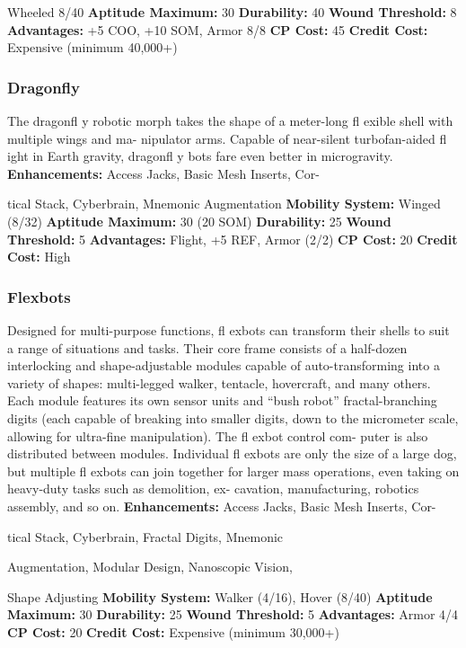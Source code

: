 Wheeled 8/40
\textbf{Aptitude Maximum: }30
\textbf{Durability: }40
\textbf{Wound Threshold: }8
\textbf{Advantages:} +5 COO, +10 SOM, Armor 8/8
\textbf{CP Cost: }45
\textbf{Credit Cost: }Expensive (minimum 40,000+)

\subsubsection{Dragonfly}

The dragonfl y robotic morph takes the shape of a 
meter-long fl exible shell with multiple wings and ma-
nipulator arms. Capable of near-silent turbofan-aided 
fl ight in Earth gravity, dragonfl y bots fare even better 
in microgravity.
\textbf{Enhancements:} Access Jacks, Basic Mesh Inserts, Cor-

tical Stack, Cyberbrain, Mnemonic Augmentation
\textbf{Mobility System:} Winged (8/32)
\textbf{Aptitude Maximum: }30 (20 SOM)
\textbf{Durability: }25
\textbf{Wound Threshold:} 5
\textbf{Advantages:} Flight, +5 REF, Armor (2/2)
\textbf{CP Cost: }20
\textbf{Credit Cost: }High

\subsubsection{Flexbots}

Designed for multi-purpose functions, fl exbots  can 
transform their shells to suit a range of situations 
and tasks. Their core frame consists of a half-dozen 
interlocking and shape-adjustable modules capable of 
auto-transforming into a variety of shapes: multi-legged 
walker, tentacle, hovercraft, and many others. Each 
module features its own sensor units and ``bush robot'' 
fractal-branching digits (each capable of breaking into 
smaller digits, down to the micrometer scale, allowing 
for ultra-fine manipulation). The fl exbot control com-
puter is also distributed between modules. Individual 
fl exbots are only the size of a large dog, but multiple 
fl exbots can join together for larger mass operations, 
even taking on heavy-duty tasks such as demolition, ex-
cavation, manufacturing, robotics assembly, and so on.
\textbf{Enhancements:} Access Jacks, Basic Mesh Inserts, Cor-

tical Stack, Cyberbrain, Fractal Digits, Mnemonic 

Augmentation, Modular Design, Nanoscopic Vision, 

Shape Adjusting
\textbf{Mobility System:} Walker (4/16), Hover (8/40)
\textbf{Aptitude Maximum: }30
\textbf{Durability:} 25
\textbf{Wound Threshold:} 5
\textbf{Advantages:} Armor 4/4
\textbf{CP Cost:} 20
\textbf{Credit Cost: }Expensive (minimum 30,000+)

